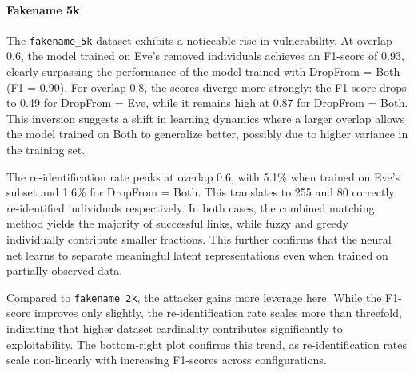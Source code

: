 


\paragraph{Fakename 5k}

The \texttt{fakename\_5k} dataset exhibits a noticeable rise in vulnerability. At overlap 0.6, the model trained on Eve’s removed individuals achieves an F1-score of 0.93, clearly surpassing the performance of the model trained with DropFrom = Both (F1 = 0.90). For overlap 0.8, the scores diverge more strongly: the F1-score drops to 0.49 for DropFrom = Eve, while it remains high at 0.87 for DropFrom = Both. This inversion suggests a shift in learning dynamics where a larger overlap allows the model trained on Both to generalize better, possibly due to higher variance in the training set.

The re-identification rate peaks at overlap 0.6, with 5.1\% when trained on Eve’s subset and 1.6\% for DropFrom = Both. This translates to 255 and 80 correctly re-identified individuals respectively. In both cases, the combined matching method yields the majority of successful links, while fuzzy and greedy individually contribute smaller fractions. This further confirms that the neural net learns to separate meaningful latent representations even when trained on partially observed data.

Compared to \texttt{fakename\_2k}, the attacker gains more leverage here. While the F1-score improves only slightly, the re-identification rate scales more than threefold, indicating that higher dataset cardinality contributes significantly to exploitability. The bottom-right plot confirms this trend, as re-identification rates scale non-linearly with increasing F1-scores across configurations.




